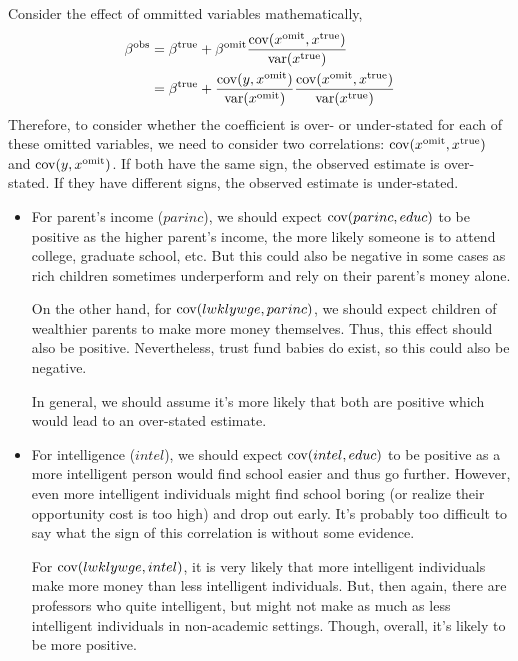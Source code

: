 \documentclass[12pt,twoside]{article}
\begin{document}
\begin{problems}
\begin{problemparts}
Consider the effect of ommitted variables mathematically,
\begin{align*}
    \beta^{\mathrm{obs}} &= \beta^{\mathrm{true}} + \beta^{\mathrm{omit}}
    \frac{\operatorname{cov}(x^{\mathrm{omit}},
    x^{\mathrm{true}})}{\operatorname{var}(x^{\mathrm{true}})} \\
    &= \beta^{\mathrm{true}} + \frac{\operatorname{cov}(y,
    x^{\mathrm{omit}})}{\operatorname{var}(x^{\mathrm{omit}})}\frac{\operatorname{cov}(x^{\mathrm{omit}},
    x^{\mathrm{true}})}{\operatorname{var}(x^{\mathrm{true}})} \\
\end{align*}
Therefore, to consider whether the coefficient is over- or under-stated for
each of these omitted variables, we need to consider two correlations:
$\operatorname{cov}(x^{\mathrm{omit}}, x^{\mathrm{true}})$ and $\operatorname{cov}(y,
x^{\mathrm{omit}})$. If both have the same sign, the observed estimate is
over-stated. If they have different signs, the observed estimate is
under-stated.

\begin{itemize}
    \item For parent's income ($parinc$), we should expect $\operatorname{cov}(parinc,
    educ)$ to be positive as the higher parent's income, the more likely
    someone is to attend college, graduate school, etc. But this could also
    be negative in some cases as rich children sometimes underperform and
    rely on their parent's money alone.

    On the other hand, for $\operatorname{cov}(lwklywge, parinc)$, we should expect
    children of wealthier parents to make more money themselves. Thus, this
    effect should also be positive. Nevertheless, trust fund babies do exist,
    so this could also be negative.

    In general, we should assume it's more likely that both are positive
    which would lead to an over-stated estimate.

    \item For intelligence ($intel$), we should expect $\operatorname{cov}(intel, educ)$ to
    be positive as a more intelligent person would find school easier and
    thus go further. However, even more intelligent individuals might find
    school boring (or realize their opportunity cost is too high) and drop
    out early. It's probably too difficult to say what the sign of this
    correlation is without some evidence.

    For $\operatorname{cov}(lwklywge, intel)$, it is very likely that more intelligent
    individuals make more money than less intelligent individuals. But, then
    again, there are professors who quite intelligent, but might not make as
    much as less intelligent individuals in non-academic settings. Though,
    overall, it's likely to be more positive.


\end{itemize}
\end{problemparts}
\end{problems}
\end{document}
